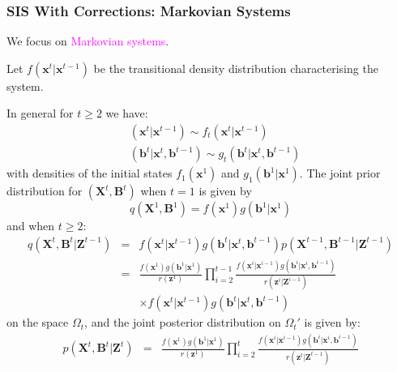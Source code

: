 \documentclass[9pt, xcolor={dvipsnames,svgnames,table}]{beamer}
\begin{document}
\begin{frame}
    \frametitle{SIS With Corrections: Markovian Systems}
    We focus on \textcolor{Fuchsia}{Markovian systems}. 
   
    Let $f(\bm{x}^t | \bm{x}^{t-1})$ be the transitional density distribution characterising the system. 
   
    In general for $t \geq 2$ we have:
    \begin{align*}
        &(\bm{x}^t | \bm{x}^{t-1}) \sim f_t(\bm{x}^t | \bm{x}^{t-1})\\
        &(\bm{b}^t | \bm{x}^t, \bm{b}^{t-1}) \sim g_t(\bm{b}^t | \bm{x}^t, \bm{b}^{t-1})
    \end{align*}
    with densities of the initial states $f_1(\bm{x}^1)$ and $g_1(\bm{b}^1 | \bm{x}^1)$.
    The joint prior distribution for $(\bm{X}^t,\bm{B}^t)$ when $t=1$ is given by 
    \begin{equation*}
    q(\bm{X}^1,\bm{B}^1) = f(\bm{x}^1)g(\bm{b}^1 | \bm{x}^1)
    \end{equation*}
    and when $t \geq 2$: 
    \begin{eqnarray*}
        q(\bm{X}^t, \bm{B}^t | \bm{Z}^{t-1}) &=& f(\bm{x}^t | \bm{x}^{t-1}) g(\bm{b}^t | \bm{x}^t, \bm{b}^{t-1}) p(\bm{X}^{t-1}, \bm{B}^{t-1} | \bm{Z}^{t-1}) \\
        & = & \frac{f(\bm{x}^1)g(\bm{b}^1 | \bm{x}^1)}{r(\bm{z}^1)} \prod_{i=2}^{t-1} \frac{f(\bm{x}^i | \bm{x}^{i-1}) g(\bm{b}^i | \bm{x}^i, \bm{b}^{i-1})}{r(\bm{z}^i | \bm{Z}^{i-1})} \\
        & & \times f(\bm{x}^t | \bm{x}^{t-1}) g(\bm{b}^t | \bm{x}^t, \bm{b}^{t-1})
    \end{eqnarray*}
    on the space $\Omega_t$, and the joint posterior distribution on $\Omega_t'$ is given by:
    \begin{eqnarray*}
        p(\bm{X}^t, \bm{B}^t | \bm{Z}^t) 
        & = & \frac{f(\bm{x}^1)g(\bm{b}^1 | \bm{x}^1)}{r(\bm{z}^1)} \prod_{i=2}^t \frac{f(\bm{x}^i | \bm{x}^{i-1}) g(\bm{b}^i | \bm{x}^i , \bm{b}^{i-1})}{r(\bm{z}^t | \bm{Z}^{t-1})} 
    \end{eqnarray*}
\end{frame}
\end{document}
